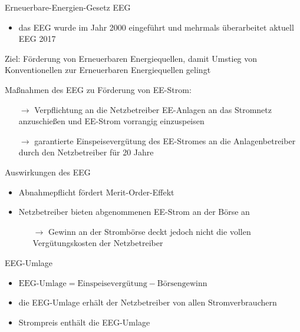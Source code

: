 \documentclass[aspectratio=1610, professionalfonts, 9pt]{beamer}
\begin{document}
\begin{frame}{Erneuerbare-Energien-Gesetz EEG}
   \begin{itemize}
     \item das EEG wurde im Jahr 2000 eingeführt und mehrmals überarbeitet aktuell EEG 2017
   \end{itemize}
\pause
    \begin{block}{Ziel:}
      Förderung von Erneuerbaren Energiequellen, damit Umstieg von Konventionellen zur Erneuerbaren Energiequellen gelingt
    \end{block}
\pause
    \begin{block}{Maßnahmen des EEG zu Förderung von EE-Strom:}
     \begin{itemize}
       \item[$\rightarrow$] Verpflichtung an die Netzbetreiber EE-Anlagen an das Stromnetz anzuschießen und EE-Strom vorrangig einzuspeisen
       \item[$\rightarrow$] garantierte Einspeisevergütung des EE-Stromes an die Anlagenbetreiber durch den Netzbetreiber für 20 Jahre
   \end{itemize}
   \end{block}
\end{frame}

\begin{frame}{Auswirkungen des EEG}
  \begin{itemize}
    \item Abnahmepflicht fördert Merit-Order-Effekt
    \item Netzbetreiber bieten abgenommenen EE-Strom an der Börse an
\begin{itemize}
  \item[$\rightarrow$] Gewinn an der Strombörse deckt jedoch nicht die vollen Vergütungskosten der Netzbetreiber
\end{itemize}
\end{itemize}
\begin{block}{EEG-Umlage}
\begin{itemize}
  \item $\text{EEG-Umlage}=\text{Einspeisevergütung}-\text{Börsengewinn}$
\item die EEG-Umlage erhält der Netzbetreiber von allen Stromverbrauchern
\item Strompreis enthält die EEG-Umlage
\end{itemize}
\end{block}
\end{frame}
\end{document}
